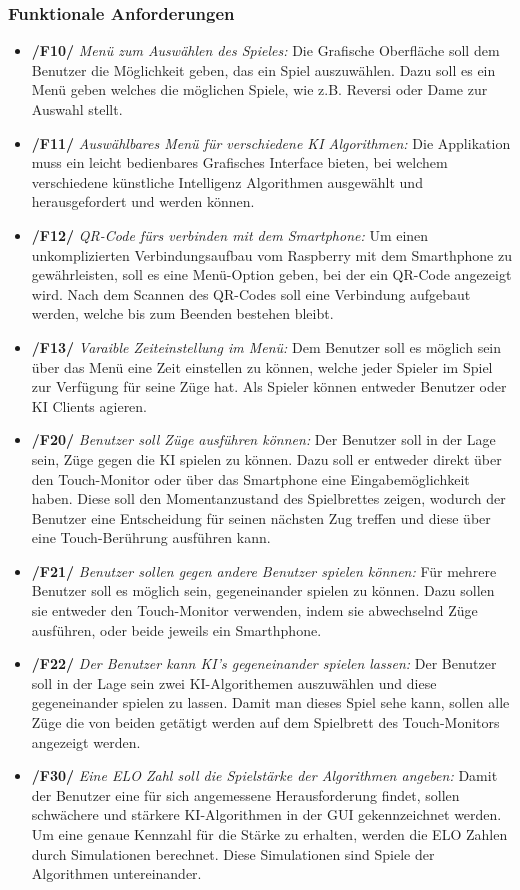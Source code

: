 \documentclass[12pt,a4paper,bibliography=totocnumbered,listof=totocnumbered]{article}
\begin{document}
\begin{appendix}
\subsubsection{Funktionale Anforderungen}
\begin{itemize}
    \item \textbf{/F10/} \textit{Menü zum Auswählen des Spieles:} Die Grafische Oberfläche soll dem Benutzer die Möglichkeit geben, das ein Spiel auszuwählen.
        Dazu soll es ein Menü geben welches die möglichen Spiele, wie z.B. Reversi oder Dame zur Auswahl stellt.
    \item \textbf{/F11/} \textit{Auswählbares Menü für verschiedene KI Algorithmen:} Die Applikation muss ein leicht bedienbares Grafisches Interface bieten,
        bei welchem verschiedene künstliche Intelligenz Algorithmen ausgewählt und herausgefordert und werden können.
    \item \textbf{/F12/} \textit{QR-Code fürs verbinden mit dem Smartphone:} Um einen unkomplizierten Verbindungsaufbau vom Raspberry mit dem Smarthphone zu 
        gewährleisten, soll es eine Menü-Option geben, bei der ein QR-Code angezeigt wird. Nach dem Scannen des QR-Codes soll eine Verbindung
        aufgebaut werden, welche bis zum Beenden bestehen bleibt.
    \item \textbf{/F13/} \textit{Varaible Zeiteinstellung im Menü:} Dem Benutzer soll es möglich sein über das Menü eine Zeit einstellen zu können, 
        welche jeder Spieler im Spiel zur Verfügung für seine Züge hat. Als Spieler können entweder Benutzer oder KI Clients agieren.
    \item \textbf{/F20/} \textit{Benutzer soll Züge ausführen können:} Der Benutzer soll in der Lage sein, Züge gegen die KI spielen zu können. Dazu soll er entweder
        direkt über den Touch-Monitor oder über das Smartphone eine Eingabemöglichkeit haben. Diese soll den Momentanzustand des Spielbrettes zeigen,
        wodurch der Benutzer eine Entscheidung für seinen nächsten Zug treffen und diese über eine Touch-Berührung ausführen kann.
    \item \textbf{/F21/} \textit{Benutzer sollen gegen andere Benutzer spielen können:} Für mehrere Benutzer soll es möglich sein, gegeneinander spielen zu können. Dazu sollen sie 
        entweder den Touch-Monitor verwenden, indem sie abwechselnd Züge ausführen, oder beide jeweils ein Smarthphone.
    \item \textbf{/F22/} \textit{Der Benutzer kann KI's gegeneinander spielen lassen:} Der Benutzer soll in der Lage sein zwei KI-Algorithemen auszuwählen
        und diese gegeneinander spielen zu lassen. Damit man dieses Spiel sehe kann, sollen alle Züge die 
        von beiden getätigt werden auf dem Spielbrett des Touch-Monitors angezeigt werden.
    \item \textbf{/F30/} \textit{Eine ELO Zahl soll die Spielstärke der Algorithmen angeben:} Damit der Benutzer eine für sich angemessene Herausforderung findet,
        sollen schwächere und stärkere KI-Algorithmen in der GUI gekennzeichnet werden. Um eine genaue Kennzahl für die Stärke zu erhalten, werden die ELO Zahlen durch
        Simulationen berechnet. Diese Simulationen sind Spiele der Algorithmen untereinander.
   

\end{itemize}
\end{appendix}
\end{document}
